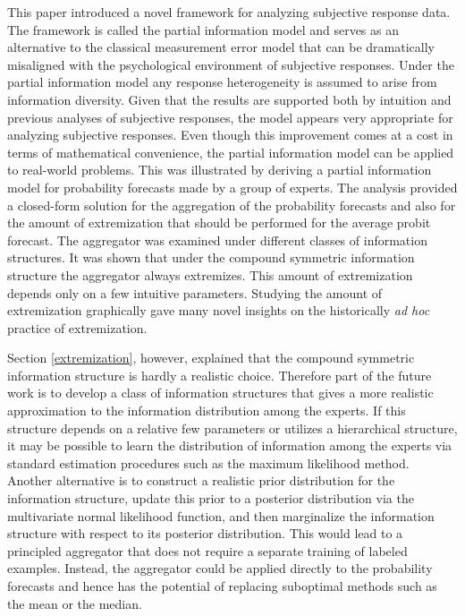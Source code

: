 \documentclass[11pt,twoside]{article}
\theoremstyle{definition}
\theoremstyle{definition}
\begin{document}
This paper introduced a novel framework for analyzing subjective response data. The framework is called the partial information model and serves as an alternative to the classical measurement error model that can be dramatically misaligned with the psychological environment of subjective responses. Under the partial information model any response heterogeneity is assumed to arise from information diversity. Given that the results are supported both by intuition and previous analyses of subjective responses, the model appears very appropriate for analyzing subjective responses. Even though this improvement comes at a cost in terms of mathematical convenience, the partial information model can be applied to real-world problems. This was illustrated by deriving a partial information model for probability forecasts made by a group of experts. The analysis provided a closed-form solution for the aggregation of the probability forecasts and also for the amount of extremization that should be performed for the average probit forecast. The aggregator was examined under different classes of information structures.  It was shown that under the compound symmetric information structure the aggregator always extremizes. This amount of extremization depends only on a few intuitive parameters. Studying the amount of extremization graphically gave many novel insights on the historically \textit{ad hoc} practice of extremization.


Section \ref{extremization}, however, explained that the compound symmetric information structure is hardly a realistic choice. Therefore part of the future work is  to develop a class of information structures that gives a more realistic approximation to the information distribution among the experts. If this structure depends on a relative few parameters or utilizes a hierarchical structure, it may be possible to learn the distribution of information among the experts via standard estimation procedures such as the maximum likelihood method. Another alternative is to construct a realistic prior distribution for the information structure, update this prior to a posterior distribution via the multivariate normal likelihood function, and then marginalize the information structure with respect to its posterior distribution.  This would lead to a principled aggregator that does not require a separate training of labeled examples. Instead, the aggregator could be applied directly to the probability forecasts and hence has the potential of replacing suboptimal methods such as the mean or the median. 
\end{document}
